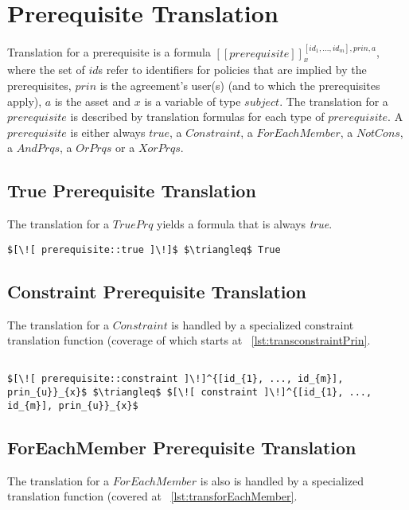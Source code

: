 \section{Prerequisite Translation}

Translation for a prerequisite is a formula $[\![prerequisite]\!]^{[id_{1}, ..., id_{m}], prin, a}_{x}$, where the set of $id$s refer to identifiers for policies that are implied by the prerequisites, $prin$ is the agreement's user(s) (and to which the prerequisites apply), $a$ is the asset and $x$ is a variable of type $subject$. The translation for a $prerequisite$ is described by translation formulas for each type of $prerequisite$. A $prerequisite$ is either always $true$, a $Constraint$, a $ForEachMember$, a $NotCons$, a $AndPrqs$, a $OrPrqs$ or a $XorPrqs$.

\subsection{True Prerequisite Translation}
The translation for a $TruePrq$ yields a formula that is always \emph{true}.

\lstset{mathescape, language=AST}  
\begin{lstlisting}[frame=single, caption={Prerequisite Translation {$\colon$} Always True Prerequisite},label={lst:transpreRequisiteTruePrq}]
	$[\![ prerequisite::true ]\!]$ $\triangleq$ True
\end{lstlisting}

\subsection{Constraint Prerequisite Translation}
The translation for a $Constraint$ is handled by a specialized constraint translation function (coverage of which starts at ~\ref{lst:transconstraintPrin}.

\lstset{mathescape, language=AST}  
\begin{lstlisting}[frame=single, caption={Prerequisite Translation {$\colon$} Constraint},label={lst:transpreRequisiteConstraint}]

$[\![ prerequisite::constraint ]\!]^{[id_{1}, ..., id_{m}], prin_{u}}_{x}$ $\triangleq$ $[\![ constraint ]\!]^{[id_{1}, ..., id_{m}], prin_{u}}_{x}$ 
\end{lstlisting}

\subsection{ForEachMember Prerequisite Translation}
The translation for a $ForEachMember$ is also is handled by a specialized translation function (covered at ~\ref{lst:transforEachMember}.

